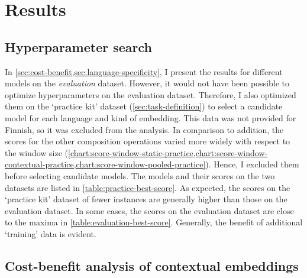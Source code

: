 \section{Results}
\label{sec:results}

\subsection{Hyperparameter search}
\label{sec:hyperparameter-search}



In \cref{sec:cost-benefit,sec:language-specificity}, I present the results for
different models on the \emph{evaluation} dataset.
However, it would not have been possible to optimize hyperparameters on the evaluation
dataset.
Therefore, I also optimized them on the `practice kit' dataset
(\cref{sec:task-definition}) to select a candidate model for each language and kind of
embedding.
This data was not provided for Finnish, so it was excluded from the analysis.
In comparison to addition, the scores for the other composition operations varied more
widely with respect to the window size
(\cref{chart:score-window-static-practice,chart:score-window-contextual-practice,chart:score-window-pooled-practice}).
Hence, I excluded them before selecting candidate models.
The models and their scores on the two datasets are listed in
\cref{table:practice-best-score}.
As expected, the scores on the `practice kit' dataset of fewer instances are generally
higher than those on the evaluation dataset.
In some cases, the scores on the evaluation dataset are close to the maxima in
\cref{table:evaluation-best-score}.
Generally, the benefit of additional `training' data is evident.



\subsection{Cost-benefit analysis of contextual embeddings}
\label{sec:cost-benefit}





